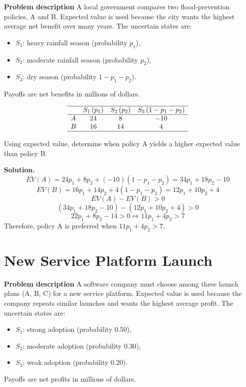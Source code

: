 \begin{ExamProblems}
		\textbf{Problem description}
		A local government compares two flood-prevention policies, A and B. Expected value is used because the city wants the highest average net benefit over many years. The uncertain states are:
		\begin{itemize}
			\item \(S_1\): heavy rainfall season (probability \(p_1\)),
			\item \(S_2\): moderate rainfall season (probability \(p_2\)),
			\item \(S_3\): dry season (probability \(1-p_1-p_2\)).
		\end{itemize}
		Payoffs are net benefits in millions of dollars.
		
		\[
		\begin{array}{lccc}
			\hline
			& S_1\,(p_1) & S_2\,(p_2) & S_3\,(1-p_1-p_2) \\
			\hline
			A & 24 & 8 & -10 \\
			B & 16 & 14 & 4 \\
			\hline
		\end{array}
		\]
		
		Using expected value, determine when policy A yields a higher expected value than policy B.
		
		\textbf{Solution.}
		\[
		EV(A)=24p_1+8p_2+(-10)(1-p_1-p_2)=34p_1+18p_2-10
		\]
		\[
		EV(B)=16p_1+14p_2+4(1-p_1-p_2)=12p_1+10p_2+4
		\]
		\[
		EV(A)-EV(B)>0
		\]
		\[
		(34p_1+18p_2-10)-(12p_1+10p_2+4)>0
		\]
		\[
		22p_1+8p_2-14>0\Rightarrow 11p_1+4p_2>7
		\]
		Therefore, policy A is preferred when \(11p_1+4p_2>7\).
		
		
		\hypertarget{c7-cu-ex7}{}
		\item
		\section{New Service Platform Launch}
		
		\textbf{Problem description}
		A software company must choose among three launch plans (A, B, C) for a new service platform. Expected value is used because the company repeats similar launches and wants the highest average profit. The uncertain states are:
		\begin{itemize}
			\item \(S_1\): strong adoption (probability \(0.50\)),
			\item \(S_2\): moderate adoption (probability \(0.30\)),
			\item \(S_3\): weak adoption (probability \(0.20\)).
		\end{itemize}
		Payoffs are net profits in millions of dollars.
		

\end{ExamProblems}

